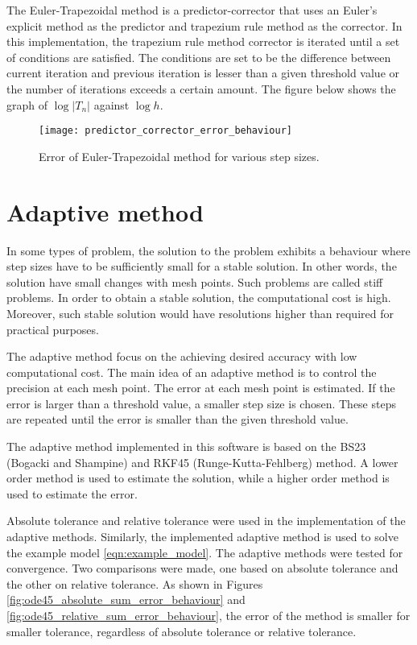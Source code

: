 The Euler-Trapezoidal method is a predictor-corrector that uses an Euler's explicit method as the predictor and trapezium rule method as the corrector. In this implementation, the trapezium rule method corrector is iterated until a set of conditions are satisfied. The conditions are set to be the difference between current iteration and previous iteration is lesser than a given threshold value or the number of iterations exceeds a certain amount. The figure below shows the graph of $\log |T_n|$ against $\log h$.

\begin{figure}
    \texttt{[image: predictor\_corrector\_error\_behaviour]}
    \caption{Error of Euler-Trapezoidal method for various step sizes.}
    \label{fig:predictor_corrector_error_behaviour}
\end{figure}

\section{Adaptive method}
\label{sec:adaptive-method}
In some types of problem, the solution to the problem exhibits a behaviour where step sizes have to be sufficiently small for a stable solution. In other words, the solution have small changes with mesh points. Such problems are called stiff problems. In order to obtain a stable solution, the computational cost is high. Moreover, such stable solution would have resolutions higher than required for practical purposes.

The adaptive method focus on the achieving desired accuracy with low computational cost. The main idea of an adaptive method is to control the precision at each mesh point. The error at each mesh point is estimated. If the error is larger than a threshold value, a smaller step size is chosen. These steps are repeated until the error is smaller than the given threshold value.

The adaptive method implemented in this software is based on the BS23 (Bogacki and Shampine) and RKF45 (Runge-Kutta-Fehlberg) method. A lower order method is used to estimate the solution, while a higher order method is used to estimate the error. 

Absolute tolerance and relative tolerance were used in the implementation of the adaptive methods. Similarly, the implemented adaptive method is used to solve the example model \ref{eqn:example_model}. The adaptive methods were tested for convergence. Two comparisons were made, one based on absolute tolerance and the other on relative tolerance. As shown in Figures \ref{fig:ode45_absolute_sum_error_behaviour} and \ref{fig:ode45_relative_sum_error_behaviour}, the error of the method is smaller for smaller tolerance, regardless of absolute tolerance or relative tolerance.


